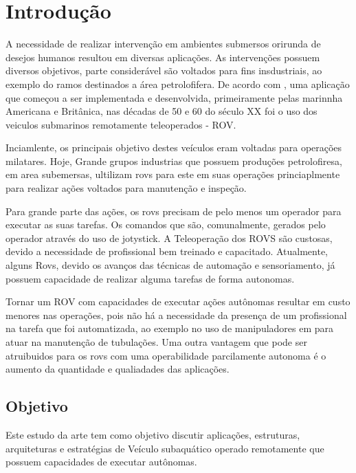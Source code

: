 \chapter{Introdução}
\label{chap:intro}
A necessidade de realizar intervenção em ambientes submersos orirunda de desejos humanos resultou em diversas aplicações.  As intervenções possuem diversos objetivos, parte considerável são voltados para fins insdustriais, ao exemplo do ramos destinados a área petrolofifera. De acordo com \cite{Bogue1}, uma aplicação que começou a ser implementada e desenvolvida, primeiramente pelas marinnha Americana e Britânica, nas décadas de 50 e 60 do século XX  foi o uso dos veiculos submarinos remotamente teleoperados - ROV.  

Inciamlente, os principais objetivo destes veículos eram voltadas para operações milatares. Hoje, Grande grupos industrias que possuem produções petrolofiresa, em area subemersas, ultilizam rovs para este em suas operações princiaplmente para realizar ações voltados para manutenção e inspeção.

Para grande parte das ações, os rovs precisam de pelo menos um operador para executar as suas tarefas. Os comandos que são, comunalmente, gerados pelo operador através do uso de jotystick. A Teleoperação dos ROVS são custosas, devido a necessidade de profissional bem treinado e capacitado. Atualmente, alguns Rovs, devido os avanços das técnicas de automação e sensoriamento, já possuem capacidade de realizar alguma tarefas de forma autonomas. 

Tornar um ROV com capacidades de executar ações autônomas resultar em custo menores nas operações, pois não há a necessidade da presença de um profissional na tarefa que foi automatizada, ao exemplo no uso de manipuladores em para atuar na manutenção de tubulações. Uma outra vantagem que pode ser atruibuidos  para os rovs com uma operabilidade parcilamente autonoma é o aumento da quantidade e qualiadades das aplicações. 
 
\section{Objetivo}
\label{sec:obj}


Este estudo da arte tem como objetivo discutir aplicações, estruturas, arquiteturas e estratégias de Veículo subaquático operado remotamente que possuem capacidades de executar autônomas.
\label{sec:obj}

